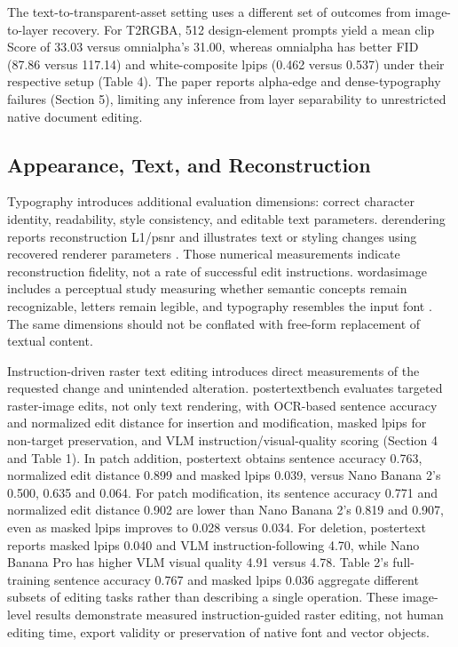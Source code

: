 The text-to-transparent-asset setting uses a different set of outcomes from image-to-layer recovery.
For T2RGBA, 512 design-element prompts yield a mean \ac{clip} Score of 33.03 versus \ac{omnialpha}'s 31.00, whereas \ac{omnialpha} has better FID (87.86 versus 117.14) and white-composite \ac{lpips} (0.462 versus 0.537) under their respective setup (Table 4).
The paper reports alpha-edge and dense-typography failures (Section 5), limiting any inference from layer separability to unrestricted native document editing.

\subsection{Appearance, Text, and Reconstruction}
Typography introduces additional evaluation dimensions: correct character identity, readability, style consistency, and editable text parameters.
\ac{derendering} reports reconstruction L1/\ac{psnr} and illustrates text or styling changes using recovered renderer parameters \citep{derendering2021}.
Those numerical measurements indicate reconstruction fidelity, not a rate of successful edit instructions.
\ac{wordasimage} includes a perceptual study measuring whether semantic concepts remain recognizable, letters remain legible, and typography resembles the input font \citep{wordasimage2023}.
The same dimensions should not be conflated with free-form replacement of textual content.

Instruction-driven raster text editing introduces direct measurements of the requested change and unintended alteration.
\ac{postertextbench} evaluates targeted raster-image edits, not only text rendering, with OCR-based sentence accuracy and normalized edit distance for insertion and modification, masked \ac{lpips} for non-target preservation, and VLM instruction/visual-quality scoring (Section 4 and Table 1).
In patch addition, \ac{postertext} obtains sentence accuracy 0.763, normalized edit distance 0.899 and masked \ac{lpips} 0.039, versus Nano Banana 2's 0.500, 0.635 and 0.064.
For patch modification, its sentence accuracy 0.771 and normalized edit distance 0.902 are lower than Nano Banana 2's 0.819 and 0.907, even as masked \ac{lpips} improves to 0.028 versus 0.034.
For deletion, \ac{postertext} reports masked \ac{lpips} 0.040 and VLM instruction-following 4.70, while Nano Banana Pro has higher VLM visual quality 4.91 versus 4.78.
Table 2's full-training sentence accuracy 0.767 and masked \ac{lpips} 0.036 aggregate different subsets of editing tasks rather than describing a single operation.
These image-level results demonstrate measured instruction-guided raster editing, not human editing time, export validity or preservation of native font and vector objects.

